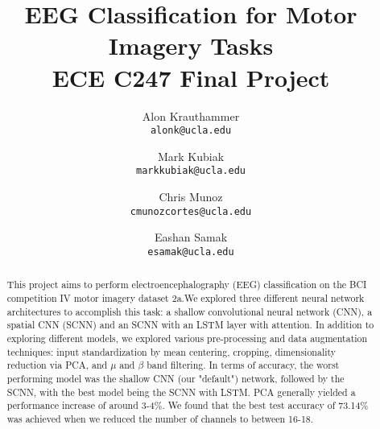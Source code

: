 \documentclass[10pt,twocolumn,letterpaper]{article}
\begin{document}
\title{
    EEG Classification for Motor Imagery Tasks\\
    {\large ECE C247 Final Project}
}

\author{Alon Krauthammer\\
{\tt\small alonk@ucla.edu}
\and
Mark Kubiak\\
{\tt\small markkubiak@ucla.edu}
\and
Chris Munoz\\
{\tt\small cmunozcortes@ucla.edu}
\and
Eashan Samak\\
{\tt\small esamak@ucla.edu}
}

\maketitle

\begin{abstract}
    This project aims to perform electroencephalography (EEG) classification 
    on the BCI competition IV motor imagery dataset 2a.We explored three different 
    neural network architectures to accomplish this task: a shallow convolutional 
    neural network (CNN), a spatial CNN (SCNN) and an SCNN with an 
    LSTM layer with attention. In addition to exploring different models, 
    we explored various pre-processing and data augmentation techniques: 
    input standardization by mean centering, cropping, dimensionality 
    reduction via PCA, and $\mu$ and $\beta$ band filtering. In terms of accuracy, 
    the worst performing model was the shallow CNN (our "default") 
    network, followed by the SCNN, with the best model being the SCNN 
    with LSTM.  PCA generally yielded a performance increase of around 3-4\%. 
    We found that the best test accuracy of 73.14\% was achieved when we 
    reduced the number of channels to between 16-18.
\end{abstract}

\end{document}
